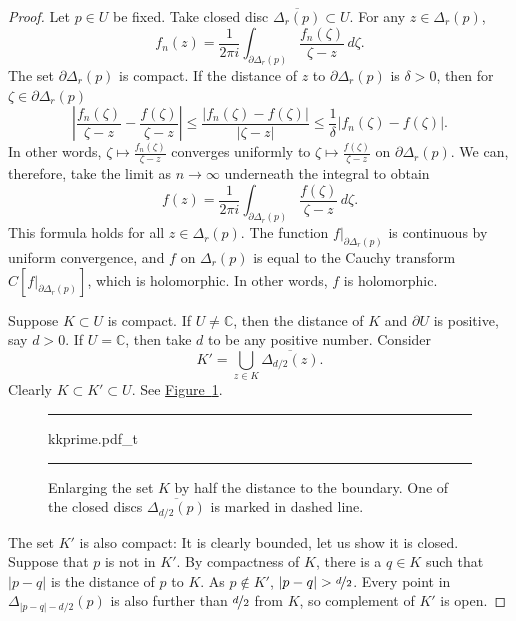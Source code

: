 \documentclass[12pt,openany]{book}
\newcommand{\sabs}[1]{\lvert {#1} \rvert}
\newcommand{\abs}[1]{\left\lvert {#1} \right\rvert}
\newcommand{\C}{{\mathbb{C}}}
\theoremstyle{plain}
\theoremstyle{remark}
\theoremstyle{definition}
\newenvironment{myfig}{%
\begin{figure}[h!t]
\noindent\rule{\textwidth}{0.5pt}\vspace{12pt}\par\centering}%
{\par\noindent\rule{\textwidth}{0.5pt}
\end{figure}}
\theoremstyle{exercise}
\theoremstyle{example}
\newcommand{\figureref}[1]{\hyperref[#1]{Figure~\ref*{#1}}}
\begin{document}
\begin{proof}
Let $p \in U$ be fixed.  Take closed disc $\overline{\Delta_r(p)} \subset
U$.  For any $z \in \Delta_r(p)$,
\begin{equation*}
f_n(z) = \frac{1}{2\pi i}
\int_{\partial \Delta_r(p)} \frac{f_n(\zeta)}{\zeta-z} \, d\zeta .
\end{equation*}
The set $\partial \Delta_r(p)$ is compact.  If the distance of $z$ to
$\partial \Delta_r(p)$ is $\delta > 0$, then for $\zeta \in \partial
\Delta_r(p)$
\begin{equation*}
\abs{\frac{f_n(\zeta)}{\zeta-z}
-
\frac{f(\zeta)}{\zeta-z}
}
\leq
\frac{\sabs{f_n(\zeta)-f(\zeta)}}{\sabs{\zeta-z}}
\leq
\frac{1}{\delta}
\sabs{f_n(\zeta)-f(\zeta)} .
\end{equation*}
In other words,
$\zeta \mapsto \frac{f_n(\zeta)}{\zeta-z}$ converges uniformly to 
$\zeta \mapsto \frac{f(\zeta)}{\zeta-z}$ on $\partial \Delta_r(p)$.
We can, therefore, take the limit as $n \to \infty$ underneath the integral
to obtain
\begin{equation*}
f(z) = \frac{1}{2\pi i}
\int_{\partial \Delta_r(p)} \frac{f(\zeta)}{\zeta-z} \, d\zeta .
\end{equation*}
This formula holds for all $z \in \Delta_r(p)$.
The function $f|_{\partial \Delta_r(p)}$ is continuous by uniform
convergence, and $f$ on $\Delta_r(p)$ is equal to
the Cauchy transform
$C[f|_{\partial \Delta_r(p)}]$, which is holomorphic.  In other words,
$f$ is holomorphic.

Suppose $K \subset U$ is compact.  If $U \not= \C$, then the distance of
$K$ and $\partial U$ is positive, say $d > 0$.  If $U=\C$, then take $d$ to be any positive number.  Consider 
\begin{equation*}
K' = \bigcup_{z \in K} \overline{\Delta_{d/2}(z)} .
\end{equation*}
Clearly $K \subset K' \subset U$.
See \figureref{fig:kkprime}.

\begin{myfig}
{kkprime.pdf_t}
\caption{Enlarging the set $K$ by half the distance to the boundary.  One of
the closed discs $\overline{\Delta_{d/2}(p)}$ is marked in dashed line.\label{fig:kkprime}}
\end{myfig}

The set $K'$ is also compact: It is clearly
bounded, let us show it is closed.  Suppose that $p$ is not in $K'$.
By compactness of $K$, there is a $q \in K$ such that $\sabs{p-q}$
is the distance of $p$ to $K$.  As $p \not\in K'$,
$\sabs{p-q} > \nicefrac{d}{2}$.
Every point in $\Delta_{\sabs{p-q}-d/2}(p)$
is also further than $\nicefrac{d}{2}$ from $K$, so
complement of $K'$ is open.


\end{proof}
\end{document}
